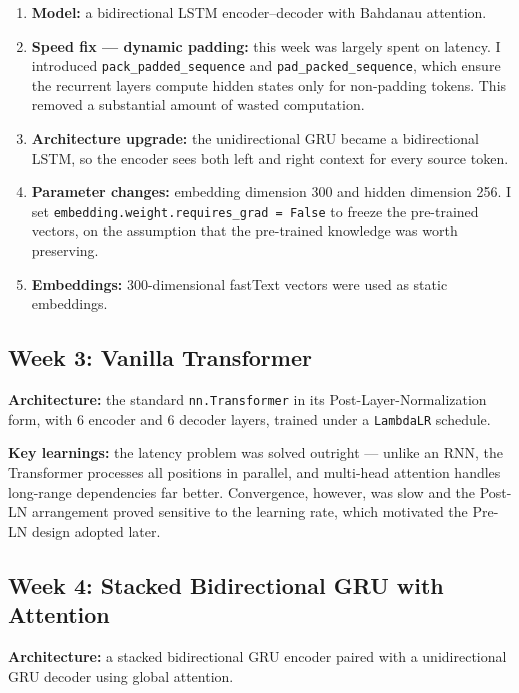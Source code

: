 \documentclass[11pt, oneside]{article}
\begin{document}
\begin{enumerate}
    \item \textbf{Model:} a bidirectional LSTM encoder--decoder with Bahdanau attention.
    \item \textbf{Speed fix --- dynamic padding:} this week was largely spent on latency. I
          introduced \texttt{pack\_padded\_sequence} and \texttt{pad\_packed\_sequence}, which
          ensure the recurrent layers compute hidden states only for non-padding tokens. This
          removed a substantial amount of wasted computation.
    \item \textbf{Architecture upgrade:} the unidirectional GRU became a bidirectional LSTM,
          so the encoder sees both left and right context for every source token.
    \item \textbf{Parameter changes:} embedding dimension 300 and hidden dimension 256. I set
          \texttt{embedding.weight.requires\_grad = False} to freeze the pre-trained vectors,
          on the assumption that the pre-trained knowledge was worth preserving.
    \item \textbf{Embeddings:} 300-dimensional fastText vectors were used as static
          embeddings.
\end{enumerate}

\subsection{Week 3: Vanilla Transformer}

\textbf{Architecture:} the standard \texttt{nn.Transformer} in its Post-Layer-Normalization
form, with 6 encoder and 6 decoder layers, trained under a \texttt{LambdaLR} schedule.

\textbf{Key learnings:} the latency problem was solved outright --- unlike an RNN, the
Transformer processes all positions in parallel, and multi-head attention handles long-range
dependencies far better. Convergence, however, was slow and the Post-LN arrangement proved
sensitive to the learning rate, which motivated the Pre-LN design adopted later.

\subsection{Week 4: Stacked Bidirectional GRU with Attention}

\textbf{Architecture:} a stacked bidirectional GRU encoder paired with a unidirectional GRU
decoder using global attention.
\end{document}
